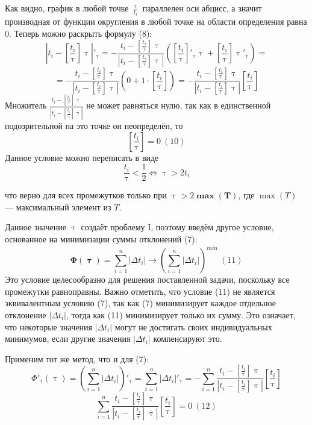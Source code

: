 \documentclass[12pt]{report}
\let\tau\uptau
\begin{document}
Как видно, график в любой точке $\frac{\tau}{t_i}$ параллелен оси абцисс, а значит производная от функции округления в любой точке на области определения равна 0. Теперь можно раскрыть формулу (8):
$$\left|t_i-\left[\frac{t_i}{\tau}\right]\tau\right|'_\tau=-\frac{t_i-\left[\frac{t_i}{\tau}\right]\tau}{|t_i-\left[\frac{t_i}{\tau}\right]\tau|}\left(\left[\frac{t_i}{\tau}\right]'_\tau\tau+\left[\frac{t_i}{\tau}\right]\tau'_\tau\right)=$$
$$=-\frac{t_i-\left[\frac{t_i}{\tau}\right]\tau}{|t_i-\left[\frac{t_i}{\tau}\right]\tau|}\left(0+1\cdot\left[\frac{t_i}{\tau}\right]\right)=-\frac{t_i-\left[\frac{t_i}{\tau}\right]\tau}{|t_i-\left[\frac{t_i}{\tau}\right]\tau|}\left[\frac{t_i}{\tau}\right]$$
Множитель $\frac{t_i-\left[\frac{t_i}{\tau}\right]\tau}{\left|t_i-\left[\frac{t_i}{\tau}\right]\tau\right|}$ не может равняться нулю, так как в единственной подозрительной на это точке он неопределён, то
$$\left[\frac{t_i}{\tau}\right]=0\ (10)$$
Данное условие можно переписать в виде
$$\frac{t_i}{\tau}<\frac{1}{2}\Leftrightarrow\tau>2t_i$$

что верно для всех промежутков только при $\tau>2\bm{\max(T)}$, где $\max(T)$ — максимальный элемент из $T$.

Данное значение $\tau$ создаёт проблему I, поэтому введём другое условие, основанное на минимизации суммы отклонений (7):
$$\bm{\Phi(\tau)}=\sum_{i=1}^n|\Delta t_i|\rightarrow\left(\sum_{i=1}^n|\Delta t_i|\right)^{min}\ (11)$$
Это условие целесообразно для решения поставленной задачи, поскольку все промежутки равноправны. Важно отметить, что условие (11) не является эквивалентным условию (7), так как (7) минимизирует каждое отдельное отклонение $|\Delta t_i|$, тогда как (11) минимизирует только их сумму. Это означает, что некоторые значения $|\Delta t_i|$ могут не достигать своих индивидуальных минимумов, если другие значения $|\Delta t_i|$ компенсируют это.

Применим тот же метод, что и для (7):
$$\Phi'_\tau(\tau)=\left(\sum_{i=1}^n|\Delta t_i|\right)'_\tau=\sum_{i=1}^n|\Delta t_i|'_\tau=-\sum_{i=1}^n\frac{t_i-\left[\frac{t_i}{\tau}\right]\tau}{|t_i-\left[\frac{t_i}{\tau}\right]\tau|}\left[\frac{t_i}{\tau}\right]$$
$$\sum_{i=1}^n\frac{t_i-\left[\frac{t_i}{\tau}\right]\tau}{|t_i-\left[\frac{t_i}{\tau}\right]\tau|}\left[\frac{t_i}{\tau}\right]=0\ (12)$$
\end{document}
